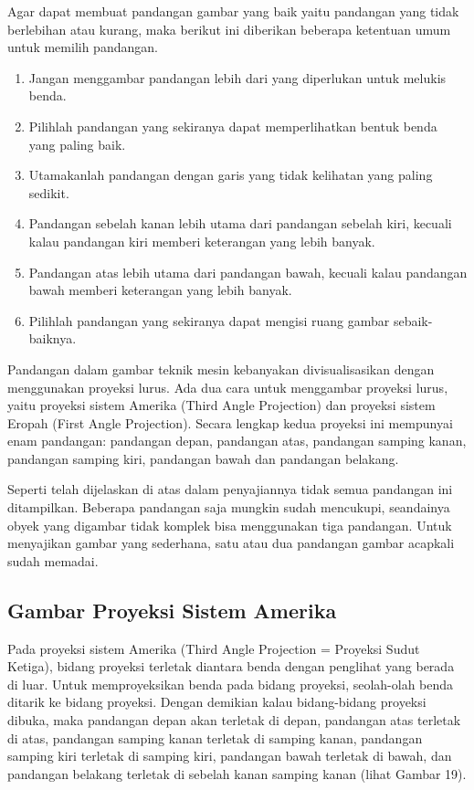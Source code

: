 \documentclass[../menggambar teknik.tex]{subfiles}
\begin{document}
Agar dapat membuat pandangan gambar yang baik yaitu pandangan yang tidak berlebihan atau kurang, maka berikut ini diberikan beberapa ketentuan umum untuk memilih pandangan.
\begin{enumerate}[label=(\alph*)]
	\item Jangan menggambar pandangan lebih dari yang diperlukan untuk melukis benda.
	\item Pilihlah pandangan yang sekiranya dapat memperlihatkan bentuk benda yang paling baik.
	\item Utamakanlah pandangan dengan garis yang tidak kelihatan yang paling sedikit.
	\item Pandangan sebelah kanan lebih utama dari pandangan sebelah kiri, kecuali kalau pandangan kiri memberi keterangan yang lebih banyak.
	\item Pandangan atas lebih utama dari pandangan bawah, kecuali kalau pandangan bawah memberi keterangan yang lebih banyak.
	\item Pilihlah pandangan yang sekiranya dapat mengisi ruang gambar sebaik-baiknya.
\end{enumerate}

Pandangan dalam gambar teknik mesin kebanyakan divisualisasikan dengan menggunakan proyeksi lurus. Ada dua cara untuk menggambar proyeksi lurus, yaitu proyeksi sistem Amerika (Third Angle Projection) dan proyeksi sistem Eropah (First Angle Projection). Secara lengkap kedua proyeksi ini mempunyai enam pandangan: pandangan depan, pandangan atas, pandangan samping kanan, pandangan samping kiri, pandangan bawah dan pandangan belakang.

Seperti telah dijelaskan di atas dalam penyajiannya tidak semua pandangan ini ditampilkan. Beberapa pandangan saja mungkin sudah mencukupi, seandainya obyek yang digambar tidak komplek bisa menggunakan tiga pandangan. Untuk menyajikan gambar yang sederhana, satu atau dua pandangan gambar acapkali sudah memadai.

\subsection{Gambar Proyeksi Sistem Amerika}
Pada proyeksi sistem Amerika (Third Angle Projection = Proyeksi Sudut Ketiga), bidang proyeksi terletak diantara benda dengan penglihat yang berada di luar. Untuk memproyeksikan benda pada bidang proyeksi, seolah-olah benda ditarik ke bidang proyeksi. Dengan demikian kalau bidang-bidang proyeksi dibuka, maka pandangan depan akan terletak di depan, pandangan atas terletak di atas, pandangan samping kanan terletak di samping kanan, pandangan samping kiri terletak di samping kiri, pandangan bawah terletak di bawah, dan pandangan belakang terletak di sebelah kanan samping kanan (lihat Gambar 19).
\end{document}
